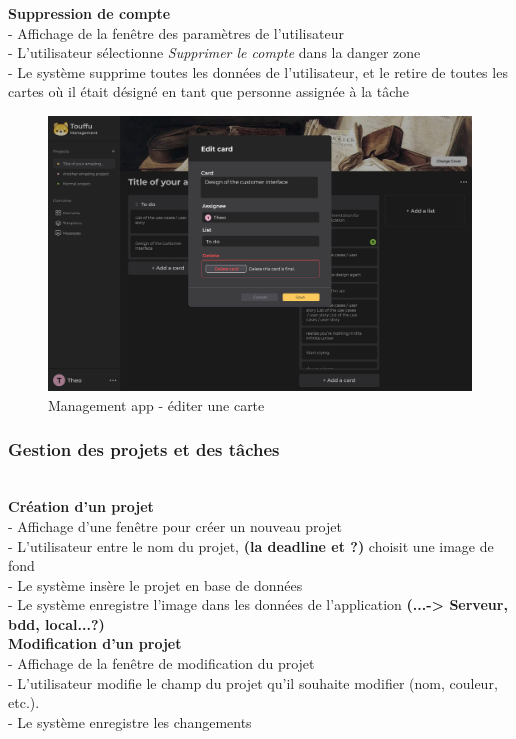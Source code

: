 \documentclass[conference]{IEEEtran}
\begin{document}
\textbf{Suppression de compte}\\
- Affichage de la fenêtre des paramètres de l'utilisateur\\
- L'utilisateur sélectionne \textit{Supprimer le compte} dans la danger zone\\
- Le système supprime toutes les données de l'utilisateur, et le retire de toutes les cartes où il était désigné en tant que personne assignée à la tâche\\

\begin{figure}[h]
	\centering
	\includegraphics[width=\columnwidth]{Ressources/Images/Touffu-management-edit-card}
	\caption{Management app - éditer une carte}
	\label{fig:touffumanagementeditcard}
\end{figure}


\subsubsection{Gestion des projets et des tâches}\hfil\\

\textbf{Création d'un projet}\\
- Affichage d'une fenêtre pour créer un nouveau projet\\
- L'utilisateur entre le nom du projet, \textbf{(la deadline et ?)} choisit une image de fond\\
- Le système insère le projet en base de données\\
- Le système enregistre l'image dans les données de l'application \textbf{(...-> Serveur, bdd, local...?)}\\

\textbf{Modification d'un projet}\\
- Affichage de la fenêtre de modification du projet\\
- L'utilisateur modifie le champ du projet qu'il souhaite modifier (nom, couleur, etc.).\\
- Le système enregistre les changements\\
\end{document}
